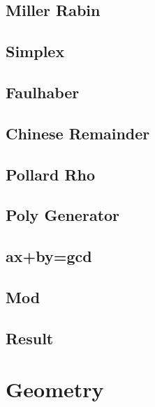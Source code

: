 \documentclass[10pt,twocolumn,oneside]{article}
\begin{document}
\subsection{Miller Rabin}


\subsection{Simplex}


\newpage

\subsection{Faulhaber}


\newpage

\subsection{Chinese Remainder}


\subsection{Pollard Rho}


\subsection{Poly Generator}


\subsection{ax+by=gcd}


\subsection{Mod}


\subsection{Result}



\section{Geometry}
\end{document}
